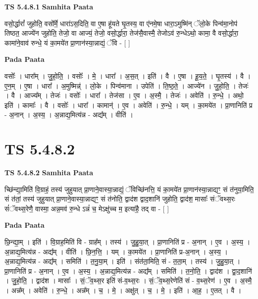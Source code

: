 \documentclass[17pt]{extarticle}
\begin{document}
\textbf{TS 5.4.8.1 } \newline
\textbf{Samhita Paata} \newline

वसो॒र्द्धारां᳚ जुहोति॒ वसो᳚र्मे॒ धारा॑ऽस॒दिति॒ वा ए॒षा हू॑यते घृ॒तस्य॒ वा ए॑नमे॒षा धारा॒ऽमुष्मि॑न् ॅलो॒के पिन्व॑मा॒नोप॑ तिष्ठत॒ आज्ये॑न जुहोति॒ तेजो॒ वा आज्यं॒ तेजो॒ वसो॒र्द्धारा॒ तेज॑सै॒वास्मै॒ तेजोऽव॑ रु॒न्धेऽथो॒ कामा॒ वै वसो॒र्द्धारा॒ कामा॑ने॒वाव॑ रुन्धे॒ यं का॒मये॑त प्रा॒णान॑स्या॒न्नाद्यं॒ ॅवि - [  ] \newline

\textbf{Pada Paata} \newline

वसोः᳚ । धारा᳚म् । जु॒हो॒ति॒ । वसोः᳚ । मे॒ । धारा᳚ । अ॒स॒त् । इति॑ । वै । ए॒षा । हू॒य॒ते॒ । घृ॒तस्य॑ । वै । ए॒न॒म् । ए॒षा । धारा᳚ । अ॒मुष्मिन्न्॑ । लो॒के । पिन्व॑माना । उपेति॑ । ति॒ष्ठ॒ते॒ । आज्ये॑न । जु॒हो॒ति॒ । तेजः॑ । वै । आज्य᳚म् । तेजः॑ । वसोः᳚ । धारा᳚ । तेज॑सा । ए॒व । अ॒स्मै॒ । तेजः॑ । अवेति॑ । रु॒न्धे॒ । अथो॒ इति॑ । कामाः᳚ । वै । वसोः᳚ । धारा᳚ । कामान्॑ । ए॒व । अवेति॑ । रु॒न्धे॒ । यम् । का॒मये॑त । प्रा॒णानिति॑ प्र - अ॒नान् । अ॒स्य॒ । अ॒न्नाद्य॒मित्य॑न्न - अद्य᳚म् । वीति॑ ।  \newline





\section{ TS 5.4.8.2 }

\textbf{TS 5.4.8.2 } \newline
\textbf{Samhita Paata} \newline

च्छि॑न्द्या॒मिति॑ वि॒ग्राहं॒ तस्य॑ जुहुयात् प्रा॒णाने॒वास्या॒न्नाद्यं॒ ॅविच्छि॑नत्ति॒ यं का॒मये॑त प्रा॒णान॑स्या॒न्नाद्यꣳ॒॒ सं त॑नुया॒मिति॒ सं त॑तां॒ तस्य॑ जुहुयात् प्रा॒णाने॒वास्या॒न्नाद्यꣳ॒॒ सं त॑नोति॒ द्वाद॑श द्वाद॒शानि॑ जुहोति॒ द्वाद॑श॒ मासाः᳚ संॅवथ्स॒रः सं॑ॅवथ्स॒रेणै॒ वास्मा॒ अन्न॒मव॑ रु॒न्धे ऽन्नं॑ च॒ मेऽक्षु॑च्च म॒ इत्या॑है॒ तद् वा - [  ] \newline

\textbf{Pada Paata} \newline

छि॒न्द्या॒म् । इति॑ । वि॒ग्राह॒मिति॑ वि - ग्राह᳚म् । तस्य॑ । जु॒हु॒या॒त् । प्रा॒णानिति॑ प्र - अ॒नान् । ए॒व । अ॒स्य॒ । अ॒न्नाद्य॒मित्य॑न्न - अद्य᳚म् । वीति॑ । छि॒न॒त्ति॒ । यम् । का॒मये॑त । प्रा॒णानिति॑ प्र-अ॒नान् । अ॒स्य॒ । अ॒न्नाद्य॒मित्य॑न्न - अद्य᳚म् । समिति॑ । त॒नु॒या॒म् । इति॑ । संत॑ता॒मिति॒ सं - त॒ता॒म् । तस्य॑ । जु॒हु॒या॒त् । प्रा॒णानिति॑ प्र - अ॒नान् । ए॒व । अ॒स्य॒ । अ॒न्नाद्य॒मित्य॑न्न - अद्य᳚म् । समिति॑ । त॒नो॒ति॒ । द्वाद॑श । द्वा॒द॒शानि॑ । जु॒हो॒ति॒ । द्वाद॑श । मासाः᳚ । सं॒ॅव॒थ्स॒र इति॑ सं-व॒थ्स॒रः । सं॒ॅव॒थ्स॒रेणेति॑ सं - व॒थ्स॒रेण॑ । ए॒व । अ॒स्मै॒ । अन्न᳚म् । अवेति॑ । रु॒न्धे॒ । अन्न᳚म् । च॒ । मे॒ । अक्षु॑त् । च॒ । मे॒ । इति॑ । आ॒ह॒ । ए॒तत् । वै ।  \newline
\end{document}
